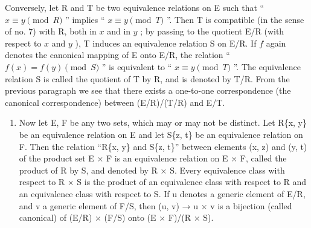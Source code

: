 Conversely, let R and T be two equivalence relations on E such that `` \(x \equiv y \pmod{R}\) '' implies `` \(x \equiv y \pmod{T}\) ''. Then T is compatible (in the sense of no. 7) with R, both in \(x\) and in \(y\) ; by passing to the quotient E/R (with respect to \(x\) and \(y\) ), T induces an equivalence relation S on E/R. If \(f\) again denotes the canonical mapping of E onto E/R, the relation `` \(f(x) = f(y) \pmod{S}\) '' is equivalent to `` \(x \equiv y \pmod{T}\) ''. The equivalence relation S is called the quotient of T by R, and is denoted by T/R. From the previous paragraph we see that there exists a one-to-one correspondence (the canonical correspondence) between (E/R)/(T/R) and E/T.

\begin{enumerate}
\def\labelenumi{\arabic{enumi}.}
\setcounter{enumi}{9}
\tightlist
\item
  Now let E, F be any two sets, which may or may not be distinct. Let R\{x, y\} be an equivalence relation on E and let S\{z, t\} be an equivalence relation on F. Then the relation ``R\{x, y\} and S\{z, t\}'' between elements (x, z) and (y, t) of the product set E × F is an equivalence relation on E × F, called the product of R by S, and denoted by R × S. Every equivalence class with respect to R × S is the product of an equivalence class with respect to R and an equivalence class with respect to S. If u denotes a generic element of E/R, and v a generic element of F/S, then (u, v) → u × v is a bijection (called canonical) of (E/R) × (F/S) onto (E × F)/(R × S).
\end{enumerate}


